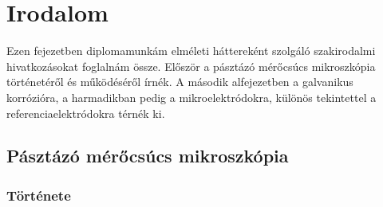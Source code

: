 \chapter{Irodalom}
\pagestyle{headings}

Ezen fejezetben diplomamunkám elméleti háttereként szolgáló szakirodalmi hivatkozásokat foglalnám össze. Először a pásztázó mérőcsúcs mikroszkópia történetéről és működéséről írnék. A második alfejezetben a galvanikus korrózióra, a harmadikban pedig a mikroelektródokra, különös tekintettel a referenciaelektródokra térnék ki.

\section{Pásztázó mérőcsúcs mikroszkópia}

\subsection{Története}


